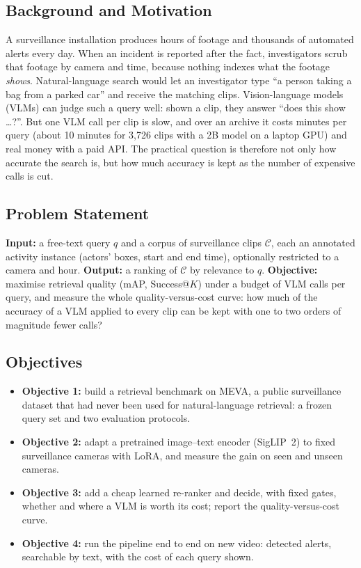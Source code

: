 \documentclass[11pt,a4paper]{article}
\begin{document}
\subsection{Background and Motivation}
A surveillance installation produces hours of footage and thousands of automated alerts every day. When an
incident is reported after the fact, investigators scrub that footage by camera and time, because nothing indexes
what the footage \emph{shows}. Natural-language search would let an investigator type ``a person taking a bag
from a parked car'' and receive the matching clips. Vision-language models (VLMs) can judge such a query well:
shown a clip, they answer ``does this show \ldots?''. But one VLM call per clip is slow, and over an archive it
costs minutes per query (about 10 minutes for 3,726 clips with a 2B model on a laptop GPU) and real money with a
paid API. The practical question is therefore not only how accurate the search is, but how much accuracy is
kept as the number of expensive calls is cut.

\subsection{Problem Statement}
\textbf{Input:} a free-text query $q$ and a corpus of surveillance clips $\mathcal{C}$, each an annotated activity
instance (actors' boxes, start and end time), optionally restricted to a camera and hour.
\textbf{Output:} a ranking of $\mathcal{C}$ by relevance to $q$.
\textbf{Objective:} maximise retrieval quality (mAP, Success@$K$) under a budget of VLM calls per query, and
measure the whole quality-versus-cost curve: how much of the accuracy of a VLM applied to every clip can be kept
with one to two orders of magnitude fewer calls?

\subsection{Objectives}
\begin{itemize}
  \item \textbf{Objective 1:} build a retrieval benchmark on MEVA, a public surveillance dataset that had never
        been used for natural-language retrieval: a frozen query set and two evaluation protocols.
  \item \textbf{Objective 2:} adapt a pretrained image--text encoder (SigLIP~2) to fixed surveillance cameras with
        LoRA, and measure the gain on seen and unseen cameras.
  \item \textbf{Objective 3:} add a cheap learned re-ranker and decide, with fixed gates, whether and where a VLM is
        worth its cost; report the quality-versus-cost curve.
  \item \textbf{Objective 4:} run the pipeline end to end on new video: detected alerts, searchable by text, with
        the cost of each query shown.
\end{itemize}
\end{document}
